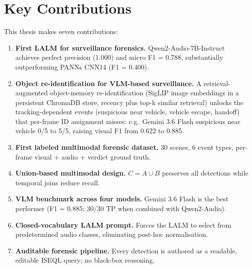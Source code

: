 \section{Key Contributions}
\label{sec:disc-contrib}

This thesis makes seven contributions:

\begin{enumerate}
  \item \textbf{First LALM for surveillance forensics.} Qwen2-Audio-7B-Instruct achieves perfect precision (1.000) and micro F1 = 0.788, substantially outperforming PANNs CNN14 (F1 = 0.400).
  \item \textbf{Object re-identification for VLM-based surveillance.} A retrieval-augmented object-memory re-identification (SigLIP image embeddings in a persistent ChromaDB store, recency plus top-k similar retrieval) unlocks the tracking-dependent events (suspicious near vehicle, vehicle escape, handoff) that per-frame ID assignment misses: e.g.\ Gemini 3.6 Flash suspicious near vehicle 0/5 to 5/5, raising visual F1 from 0.622 to 0.885.
  \item \textbf{First labeled multimodal forensic dataset.} 30 scenes, 6 event types, per-frame visual + audio + verdict ground truth.
  \item \textbf{Union-based multimodal design.} $C = A \cup B$ preserves all detections while temporal joins reduce recall.
  \item \textbf{VLM benchmark across four models.} Gemini 3.6 Flash is the best performer (F1 = 0.885; 30/30 TP when combined with Qwen2-Audio).
  \item \textbf{Closed-vocabulary LALM prompt.} Forces the LALM to select from predetermined audio classes, eliminating post-hoc normalisation.
  \item \textbf{Auditable forensic pipeline.} Every detection is authored as a readable, editable ISEQL query; no black-box reasoning.
\end{enumerate}
